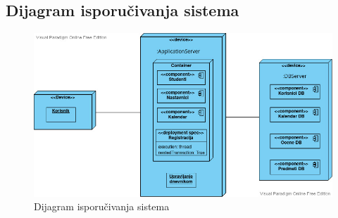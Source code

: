 \documentclass{article}
\begin{document}
\newpage
\subsection{Dijagram isporučivanja sistema}
\begin{figure} [!ht]
    \begin{center}
        \includegraphics[scale=0.5]{imgs/Dijagram isporucivanja.vpd.jpg}
    \end{center}
\caption{Dijagram isporučivanja sistema}
\end{figure}
\end{document}
